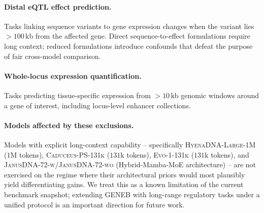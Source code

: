 \documentclass{article}
\theoremstyle{plain}
\theoremstyle{definition}
\theoremstyle{remark}
\begin{document}
\paragraph{Distal eQTL effect prediction.} Tasks linking sequence
variants to gene expression changes when the variant lies $>100$\,kb
from the affected gene. Direct sequence-to-effect formulations
require long context; reduced formulations introduce confounds that
defeat the purpose of fair cross-model comparison.

\paragraph{Whole-locus expression quantification.} Tasks predicting
tissue-specific expression from $>10$\,kb genomic windows around a
gene of interest, including locus-level enhancer collections.

\paragraph{Models affected by these exclusions.} Models with
explicit long-context capability -- specifically
\textsc{HyenaDNA-Large-1M} ($1$M tokens),
\textsc{Caduceus-PS-131k} ($131$k tokens),
\textsc{Evo-1-131k} ($131$k tokens), and
\textsc{JanusDNA-72-w}/\textsc{JanusDNA-72-wo} (Hybrid-Mamba-MoE
architecture) -- are not exercised on the regime where their architectural
priors would most plausibly yield differentiating gains. We treat
this as a known limitation of the current benchmark snapshot;
extending GENEB with long-range regulatory tasks under a unified
protocol is an important direction for future work.

\newpage

\end{document}
